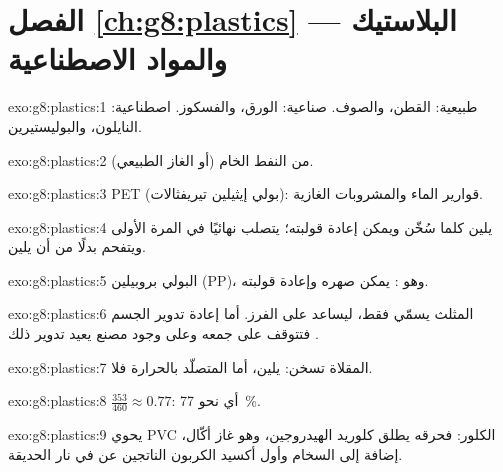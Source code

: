 \section*{الفصل \ref{ch:g8:plastics} --- البلاستيك والمواد الاصطناعية}

\begin{solution}{exo:g8:plastics:1}
طبيعية: القطن، والصوف. صناعية: الورق، والفسكوز. اصطناعية: النايلون،
والبوليستيرين.
\end{solution}

\begin{solution}{exo:g8:plastics:2}
من النفط الخام (أو الغاز الطبيعي).
\end{solution}

\begin{solution}{exo:g8:plastics:3}
PET (بولي إيثيلين تيريفثالات): قوارير الماء والمشروبات الغازية.
\end{solution}

\begin{solution}{exo:g8:plastics:4}
 يلين كلما سُخّن ويمكن إعادة قولبته؛  يتصلب نهائيًا في المرة الأولى ويتفحم بدلًا من أن يلين.
\end{solution}

\begin{solution}{exo:g8:plastics:5}
البولي بروبيلين (PP)، وهو : يمكن صهره وإعادة قولبته.
\end{solution}

\begin{solution}{exo:g8:plastics:6}
المثلث يسمّي  فقط، ليساعد على الفرز. أما إعادة تدوير الجسم فتتوقف
على جمعه وعلى وجود مصنع يعيد تدوير ذلك
.
\end{solution}

\begin{solution}{exo:g8:plastics:7}
المقلاة تسخن:  يلين، أما المتصلّد بالحرارة فلا.
\end{solution}

\begin{solution}{exo:g8:plastics:8}
$\frac{353}{460} \approx 0.77$: أي نحو \qty{77}{\percent}.
\end{solution}

\begin{solution}{exo:g8:plastics:9}
يحوي PVC الكلور: فحرقه يطلق كلوريد الهيدروجين، وهو غاز أكّال، إضافة إلى
السخام وأول أكسيد الكربون الناتجين عن  في نار
الحديقة.
\end{solution}


